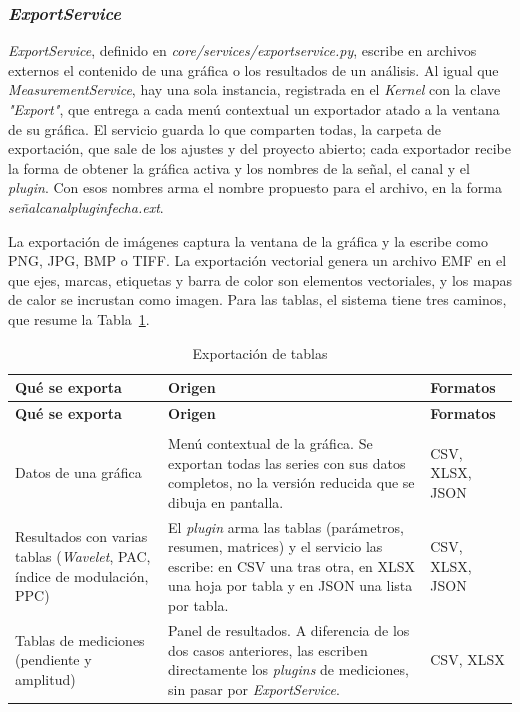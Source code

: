 \documentclass[12pt,letterpaper,oneside]{article}
\DeclareRobustCommand{\_}{\textunderscore\allowbreak}
\begin{document}
\subsubsection{\textit{ExportService}}
\label{sec:sdd_export}

\textit{ExportService}, definido en \textit{core/services/export\_service.py}, escribe en archivos externos el contenido de una gráfica o los resultados de un análisis. Al igual que \textit{MeasurementService}, hay una sola instancia, registrada en el \textit{Kernel} con la clave \textit{"Export"}, que entrega a cada menú contextual un exportador atado a la ventana de su gráfica. El servicio guarda lo que comparten todas, la carpeta de exportación, que sale de los ajustes y del proyecto abierto; cada exportador recibe la forma de obtener la gráfica activa y los nombres de la señal, el canal y el \textit{plugin}. Con esos nombres arma el nombre propuesto para el archivo, en la forma \textit{señal\_canal\_plugin\_fecha.ext}.

La exportación de imágenes captura la ventana de la gráfica y la escribe como PNG, JPG, BMP o TIFF. La exportación vectorial genera un archivo EMF en el que ejes, marcas, etiquetas y barra de color son elementos vectoriales, y los mapas de calor se incrustan como imagen. Para las tablas, el sistema tiene tres caminos, que resume la Tabla~\ref{tab:sdd_export_tablas}.

\begin{center}
\small
\begin{longtable}{|p{}|p{}|p{}|}
\hline
\textbf{Qué se exporta} & \textbf{Origen} & \textbf{Formatos} \\
\hline
\endfirsthead
\hline
\textbf{Qué se exporta} & \textbf{Origen} & \textbf{Formatos} \\
\hline
\endhead
\hline
\endfoot
\hline
\caption{Exportación de tablas} \label{tab:sdd_export_tablas} \\
\endlastfoot
Datos de una gráfica & Menú contextual de la gráfica. Se exportan todas las series con sus datos completos, no la versión reducida que se dibuja en pantalla. & CSV, XLSX, JSON \\
\hline
Resultados con varias tablas (\textit{Wavelet}, PAC, índice de modulación, PPC) & El \textit{plugin} arma las tablas (parámetros, resumen, matrices) y el servicio las escribe: en CSV una tras otra, en XLSX una hoja por tabla y en JSON una lista por tabla. & CSV, XLSX, JSON \\
\hline
Tablas de mediciones (pendiente y amplitud) & Panel de resultados. A diferencia de los dos casos anteriores, las escriben directamente los \textit{plugins} de mediciones, sin pasar por \textit{ExportService}. & CSV, XLSX \\
\hline
\end{longtable}
\end{center}
\end{document}
